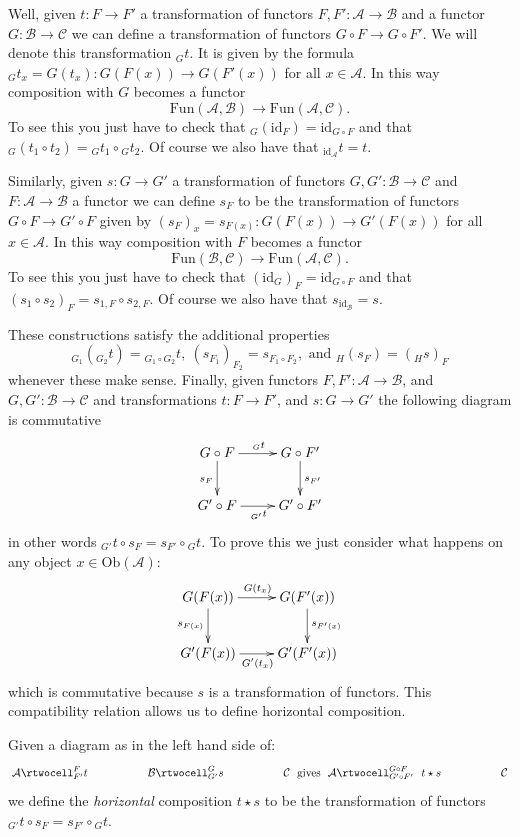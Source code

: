 \medskip\noindent
Well, given $t : F \to F'$ a transformation of
functors $F, F' : \mathcal{A} \to \mathcal{B}$ and
a functor
$G : \mathcal{B} \to \mathcal{C}$ we can define
a transformation of functors
$G\circ F \to G \circ F'$. We will denote this
transformation ${}_Gt$. It is given by the formula
${}_Gt_x = G(t_x) : G(F(x)) \to G(F'(x))$
for all $x \in \mathcal{A}$. 
In this way composition
with $G$ becomes a functor
$$
\text{Fun}(\mathcal{A}, \mathcal{B})
\longrightarrow
\text{Fun}(\mathcal{A}, \mathcal{C}).
$$
To see this you just have to check that
${}_G(\text{id}_F) = \text{id}_{G \circ F}$ and that
${}_G(t_1 \circ t_2) = {}_Gt_1 \circ {}_Gt_2$.
Of course we also have that ${}_{\text{id}_{\mathcal{A}}}t = t$.

\medskip\noindent
Similarly, given $s : G \to G'$ a transformation of
functors $G, G' : \mathcal{B} \to \mathcal{C}$ and
$F : \mathcal{A} \to \mathcal{B}$ a functor we can define
$s_F$ to be the transformation of functors
$G\circ F \to G' \circ F$ given by
$(s_F)_x = s_{F(x)} : G(F(x)) \to G'(F(x))$
for all $x \in \mathcal{A}$. In this way
composition with $F$ becomes a functor
$$
\text{Fun}(\mathcal{B}, \mathcal{C})
\longrightarrow
\text{Fun}(\mathcal{A}, \mathcal{C}).
$$
To see this you just have to check that
$(\text{id}_G)_F = \text{id}_{G\circ F}$ and that
$(s_1 \circ s_2)_F = s_{1,F} \circ s_{2,F}$.
Of course we also have that $s_{\text{id}_{\mathcal{B}}} = s$.

\medskip\noindent
These constructions satisfy the additional properties
$$
{}_{G_1}({}_{G_2}t) = {}_{G_1\circ G_2}t,\ 
(s_{F_1})_{F_2} = s_{F_1 \circ F_2}, \text{ and }
{}_H(s_F) = ({}_Hs)_F
$$
whenever these make sense.
Finally, given functors $F, F' : \mathcal{A} \to \mathcal{B}$,
and $G, G' : \mathcal{B} \to \mathcal{C}$ and transformations
$t : F \to F'$, and $s : G \to G'$ the following
diagram is commutative
$$
\xymatrix{
G \circ F \ar[r]^{{}_Gt} \ar[d]_{s_F}
&
G \circ F' \ar[d]^{s_{F'}} \\
G' \circ F \ar[r]_{{}_{G'}t}
&
G' \circ F'
}
$$
in other words ${}_{G'}t \circ s_F =  s_{F'}\circ {}_Gt$.
To prove this we just consider what happens on
any object $x \in \text{Ob}(\mathcal{A})$:
$$
\xymatrix{
G(F(x)) \ar[r]^{G(t_{x})} \ar[d]_{s_{F(x)}}
&
G(F'(x)) \ar[d]^{s_{F'(x)}} \\
G'(F(x)) \ar[r]_{G'(t_{x})}
&
G'(F'(x))
}
$$
which is commutative because $s$ is a transformation
of functors. This compatibility relation allows us
to define horizontal composition.

\begin{definition}
\label{definition-horizontal-composition}
Given a diagram as in the left hand side of:
$$
\xymatrixcolsep{4pc}
\xymatrix{
\mathcal{A}
\rtwocell^F_{F'}{t}
&
\mathcal{B}
\rtwocell^G_{G'}{s}
&
\mathcal{C}
} 
\text{ gives }
\xymatrix{
\mathcal{A}
\rtwocell^{G \circ F} _{G' \circ F'}{\ \ t \star s}
&
\mathcal{C}
}
$$
we define the {\it horizontal} composition $t \star s$ to be the
transformation of functors ${}_{G'}t \circ s_F =  s_{F'}\circ {}_Gt$.
\end{definition}

